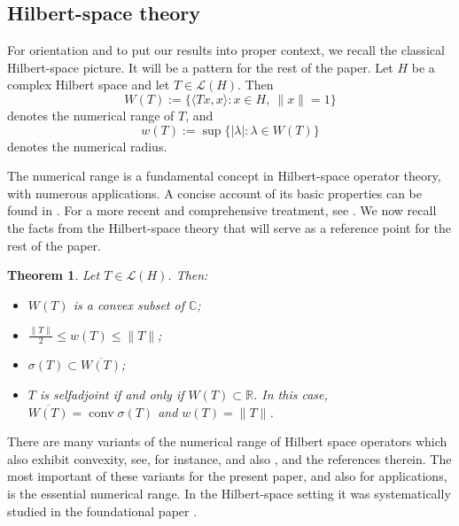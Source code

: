 \documentclass[11pt]{amsart}
\numberwithin{equation}{section}
\newtheorem{theorem}{Theorem}[section]
\theoremstyle{definition}
\theoremstyle{remark}
\DeclareMathOperator{\conv}{conv}
\newcommand{\R}{\mathbb{R}}
\newcommand{\C}{\mathbb{C}}
\newcommand{\ip}[2]{\langle #1,#2\rangle}
\begin{document}
 
\subsection{Hilbert-space theory}

For orientation and to put our results into proper context, we recall the classical Hilbert-space picture.
It will be a pattern for the rest of the paper.
Let $H$ be a complex Hilbert space and let $T\in \mathcal L(H)$. Then
\[
W(T):=\{\ip{Tx}{x}: x\in H,\ \|x\|=1\}
\]
denotes the numerical range of $T$, and
\[
w(T):=\sup\{|\lambda|: \lambda\in W(T)\}
\]
denotes the numerical radius.

The numerical range is a fundamental concept in Hilbert-space operator
theory, with numerous applications. A concise account of its basic properties
can be found in \cite{GR}. For a more recent and comprehensive treatment,
see \cite{GW}. We now recall the facts from the Hilbert-space theory that
will serve as a reference point for the rest of the paper.


\begin{theorem}
Let $T\in \mathcal L(H)$. Then:
\begin{itemize}
\item[(i)] $W(T)$ is a convex subset of $\C$;
\item[(ii)] $\frac{\|T\|}{2}\le w(T)\le\|T\|$;
\item[(iii)] $\sigma(T)\subset\overline{W(T)}$;
\item[(iv)] $T$ is selfadjoint if and only if $W(T)\subset\R$. In this case, $\overline{W(T)}=\conv\sigma(T)$ and $w(T)=\|T\|$.
\end{itemize}
\end{theorem}




There are many variants of the numerical range of Hilbert space operators
which also exhibit convexity, see, for instance, \cite[Sections~4 and~8]{GW}
and also \cite[Section~5]{MT-jointnr}, \cite{MT} and the references therein.
The most important of these variants for the present paper, and also for
applications, is the essential numerical range. In the Hilbert-space setting
it was systematically studied in the foundational paper \cite{FSW}.
\end{document}
